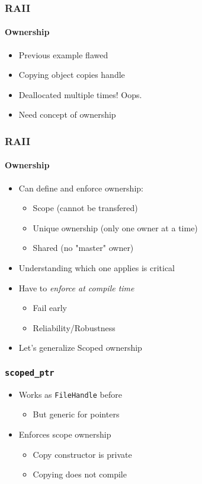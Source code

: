\begin{frame}
    \frametitle{RAII}
    \framesubtitle{Ownership}
    \begin{itemize}
        \item Previous example flawed
        \item Copying object copies handle
        \item Deallocated multiple times! Oops.
        \item Need concept of ownership
    \end{itemize}
\end{frame}

\begin{frame}
    \frametitle{RAII}
    \framesubtitle{Ownership}
    \begin{itemize}
        \item Can define and enforce ownership:
            \begin{itemize}
                \item Scope (cannot be transfered)
                \item Unique ownership (only one owner at a time)
                \item Shared (no "master" owner)
            \end{itemize}
        \item Understanding which one applies is critical
        \item Have to \emph{enforce at compile time}
            \begin{itemize}
                \item Fail early
                \item Reliability/Robustness
            \end{itemize}
        \item Let's generalize Scoped ownership
    \end{itemize}
\end{frame}

\begin{frame}
    \frametitle{\texttt{scoped\_ptr}}
    \begin{itemize}
        \item Works as \texttt{FileHandle} before
            \begin{itemize}
                \item But generic for pointers
            \end{itemize}
        \item Enforces scope ownership
            \begin{itemize}
                \item Copy constructor is private
                \item Copying does not compile
            \end{itemize}
    \end{itemize}
\end{frame}

